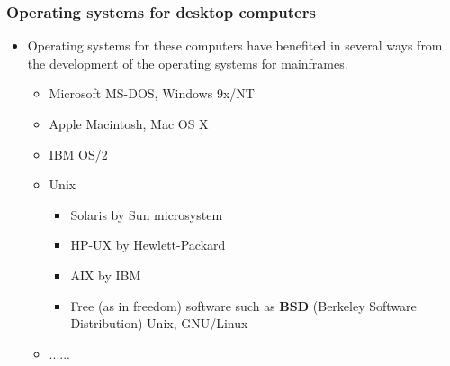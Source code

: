 \documentclass[CJKutf8,xcolor=pdftex,dvipsnames,table]{beamer}
\begin{document}
\begin{CJK*}{UTF8}{song}
  \begin{frame}
  \frametitle{Operating systems for desktop computers} \pause
	  \begin{itemize}
	  	\item{Operating systems for these computers have benefited in several ways from the development of the operating systems for mainframes.} \pause
	    \begin{itemize}
		    \item{Microsoft MS-DOS, Windows 9x/NT} \pause
		    \item{Apple Macintosh, Mac OS X} \pause
		    \item{IBM OS/2} \pause
		    \item{Unix} \pause
		      \begin{itemize}
		      \item{Solaris by Sun microsystem} \pause
		      \item{HP-UX by Hewlett-Packard} \pause
		      \item{AIX by IBM} \pause
		      \item{Free (as in freedom) software such as \textbf{BSD} (Berkeley Software Distribution) Unix, GNU/Linux} \pause
		      \end{itemize}
		    \item{......}
	    \end{itemize}
	  \end{itemize}
  \end{frame}


\end{CJK*}
\end{document}

